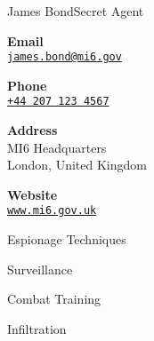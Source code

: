 \documentclass{article}
\begin{document}
\begin{cv}[avatar]{James Bond}{Secret Agent}
\cvsidebar %

\begin{cvitem}[Envelope][4]
    \textbf{Email}\\
    \href{mailto:james.bond@mi6.gov}{\texttt{james.bond@mi6.gov}}
\end{cvitem}

\cvseparator[3]
\begin{cvitem}[Phone][4]
    \textbf{Phone}\\
    \href{tel:+442071234567}{\texttt{+44 207 123 4567}}
\end{cvitem}

\cvseparator[3]
\begin{cvitem}[Home][4]
    \textbf{Address}\\
    MI6 Headquarters\\ London, United Kingdom
\end{cvitem}

\cvseparator[3]
\begin{cvitem}[Globe][4]
    \textbf{Website}\\
    \href{https://www.mi6.gov.uk}{\texttt{www.mi6.gov.uk}}
\end{cvitem}


\begin{cvitem}
    Espionage Techniques
\end{cvitem}

\cvseparator
\begin{cvitem}
    Surveillance
\end{cvitem}

\cvseparator
\begin{cvitem}
    Combat Training
\end{cvitem}

\cvseparator
\begin{cvitem}
    Infiltration
\end{cvitem}


\end{cv}
\end{document}
